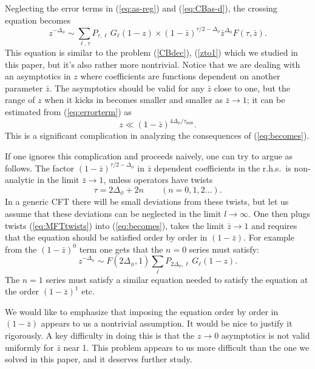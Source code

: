\documentclass[12pt]{article}
\newcommand{\reef}[1]{(\ref{#1})}
\newcommand{\beq}{\begin{equation}}
\newcommand{\eeq}{\end{equation}}
\newcommand{\Df}{{\Delta_\phi}}
\numberwithin{equation}{section}
\begin{document}
Neglecting the error terms in \reef{eq:as-reg} and \reef{eq:CBas-d}, the crossing equation becomes
\beq
\label{eq:becomes}
z^{-{\Df}}\sim \sum_{\ell,\tau} P_{\tau,\ell}\, G_{\ell}(1-z) \times (1-\bar z)^{\tau/2-\Df} \bar z^{\Df} F(\tau,\bar z).
\eeq
This equation is similar to the problem \reef{CBdec}, \reef{zto1} which we studied in this paper, but it's also rather more nontrivial. Notice that we are dealing with an asymptotics in $z$ where coefficients are functions dependent on another parameter $\bar z$. The asymptotics should be valid for any $\bar z$ close to one, but the range of $z$ when it kicks in becomes smaller and smaller as $\bar z\to 1$; it can be estimated from \reef{eq:errorterm} as
\beq
z\ll (1-\bar z)^{4\Df/\tau_{\min}}.
\eeq
This is a significant complication in analyzing the consequences of \reef{eq:becomes}.

If one ignores this complication and proceeds naively, one can try to argue as follows. The factor $(1-\bar z)^{\tau/2-\Df}$ in $\bar z$ dependent coefficients in the r.h.s.~is non-analytic in the limit $\bar z\to 1$, unless operators have twists
\beq
\label{eq:MFTtwists}
\tau = 2\Df+2n\qquad(n=0,1,2\ldots).
\eeq
In a generic CFT there will be small deviations from these twists, but let us assume that these deviations can be neglected in the limit $l\to \infty$. One then plugs twists \reef{eq:MFTtwists} into \reef{eq:becomes}, takes the limit $\bar z\to 1$
and requires that the equation should be satisfied order by order in $(1-\bar z)$. 
For example from the $(1-\bar z)^0$ term one gets that the $n=0$ series must satisfy:
\beq
\label{eq:n=0}
z^{-{\Df}}\sim F(2\Df, 1) \sum_{\ell} P_{2\Df,\ell}\, G_{\ell}(1-z) .
\eeq
The $n=1$ series must satisfy a similar equation needed to satisfy the equation at the order $(1-\bar z)^1$ etc.

We would like to emphasize that imposing the equation order by order in $(1-\bar z)$ appears to us a nontrivial assumption. It would be nice to justify it rigorously. A key difficulty in doing this is that the $z\to 0$ asymptotics is not valid uniformly for $\bar z$ near 1. {This problem appears to us more difficult than the one we solved in this paper, and it deserves further study.}
\end{document}
